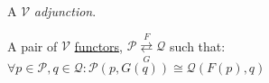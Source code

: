 A $\mathcal{V}$ \emph{adjunction}.

A pair of $\mathcal{V}$ \href{doc/1 math/Seven Sketches in Compositionality/Chapter 2: Resource theories/4 Constructions on V-categories/2 Enriched functors/1 V-functor}{functors}, $\mathcal{P}\overset{F}{\underset{G}\rightleftarrows} \mathcal{Q}$ such that: $\forall p\in \mathcal{P}, q \in \mathcal{Q}: \mathcal{P}(p,G(q)) \cong \mathcal{Q}(F(p),q)$

